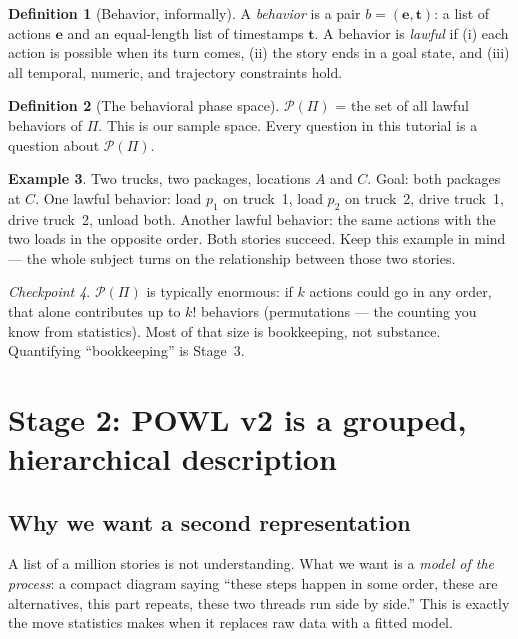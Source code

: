\documentclass[11pt]{article}
\theoremstyle{definition}
\newtheorem{definition}{Definition}[section]
\newtheorem{example}[definition]{Example}
\theoremstyle{plain}
\theoremstyle{remark}
\newtheorem{checkpoint}[definition]{Checkpoint}
\begin{document}
\begin{definition}[Behavior, informally]
A \emph{behavior} is a pair $b = (\mathbf{e}, \mathbf{t})$: a list of
actions $\mathbf{e}$ and an equal-length list of timestamps $\mathbf{t}$.
A behavior is \emph{lawful} if (i) each action is possible when its turn
comes, (ii) the story ends in a goal state, and (iii) all temporal, numeric,
and trajectory constraints hold.
\end{definition}

\begin{definition}[The behavioral phase space]
$\mathcal{P}(\Pi)$ = the set of all lawful behaviors of $\Pi$. This is our
sample space. Every question in this tutorial is a question about
$\mathcal{P}(\Pi)$.
\end{definition}

\begin{example}\label{ex:logistics}
Two trucks, two packages, locations $A$ and $C$. Goal: both packages at $C$.
One lawful behavior: load $p_1$ on truck~1, load $p_2$ on truck~2, drive
truck~1, drive truck~2, unload both. Another lawful behavior: the same
actions with the two loads in the opposite order. Both stories succeed.
Keep this example in mind --- the whole subject turns on the relationship
between those two stories.
\end{example}

\begin{checkpoint}
$\mathcal{P}(\Pi)$ is typically enormous: if $k$ actions could go in any
order, that alone contributes up to $k!$ behaviors (permutations --- the
counting you know from statistics). Most of that size is bookkeeping, not
substance. Quantifying ``bookkeeping'' is Stage~3.
\end{checkpoint}

\section{Stage 2: POWL v2 is a grouped, hierarchical description}
\label{sec:powl}

\subsection{Why we want a second representation}

A list of a million stories is not understanding. What we want is a
\emph{model of the process}: a compact diagram saying ``these steps happen
in some order, these are alternatives, this part repeats, these two threads
run side by side.'' This is exactly the move statistics makes when it
replaces raw data with a fitted model.
\end{document}
